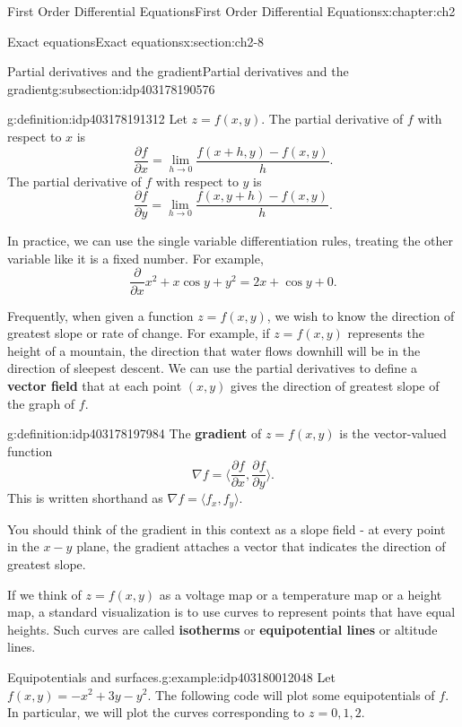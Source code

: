 \documentclass[oneside,10pt,]{book}
\newcommand{\terminology}[1]{\textbf{#1}}
\numberwithin{equation}{section}
\numberwithin{equation}{section}
\begin{document}
\begin{chapterptx}{First Order Differential Equations}{}{First Order Differential Equations}{}{}{x:chapter:ch2}
\begin{sectionptx}{Exact equations}{}{Exact equations}{}{}{x:section:ch2-8}
\begin{subsectionptx}{Partial derivatives and the gradient}{}{Partial derivatives and the gradient}{}{}{g:subsection:idp403178190576}
\begin{definition}{}{g:definition:idp403178191312}
Let \(z = f(x,y)\). The partial derivative of \(f\) with respect to \(x\) is%
\begin{equation*}
\frac{\partial f}{\partial x} = \lim_{h \to 0} \frac{f(x + h, y) - f(x,y)}{h}.
\end{equation*}
The partial derivative of \(f\) with respect to \(y\) is%
\begin{equation*}
\frac{\partial f}{\partial y} = \lim_{h\to 0}\frac{f(x, y+h) - f(x,y)}{h}.
\end{equation*}
%
\end{definition}
In practice, we can use the single variable differentiation rules, treating the other variable like it is a fixed number. For example,%
\begin{equation*}
\frac{\partial}{\partial x} x^2 + x \cos y + y^2 = 2x + \cos y + 0.
\end{equation*}
%
\par
Frequently, when given a function \(z = f(x,y)\), we wish to know the direction of greatest slope or rate of change. For example, if \(z = f(x,y)\) represents the height of a mountain, the direction that water flows downhill will be in the direction of sleepest descent. We can use the partial derivatives to define a \terminology{vector field} that at each point \((x,y)\) gives the direction of greatest slope of the graph of \(f\).%
\begin{definition}{}{g:definition:idp403178197984}%
The \terminology{gradient} of \(z = f(x,y)\) is the vector-valued function%
\begin{equation*}
\nabla f = \langle \frac{\partial f}{\partial x}, \frac{\partial f}{\partial y}\rangle.
\end{equation*}
This is written shorthand as \(\nabla f = \langle f_x, f_y\rangle\).%
\end{definition}
You should think of the gradient in this context as a slope field - at every point in the \(x-y\) plane, the gradient attaches a vector that indicates the direction of greatest slope.%
\par
If we think of \(z = f(x,y)\) as a voltage map or a temperature map or a height map, a standard visualization is to use curves to represent points that have equal heights. Such curves are called \terminology{isotherms} or \terminology{equipotential lines} or altitude lines.%
\begin{example}{Equipotentials and surfaces.}{g:example:idp403180012048}%
Let \(f(x, y) = -x^2 + 3y - y^2\). The following code will plot some equipotentials of \(f\). In particular, we will plot the curves corresponding to \(z = 0, 1, 2\).%

\end{example}
\end{subsectionptx}
\end{sectionptx}
\end{chapterptx}
\end{document}
